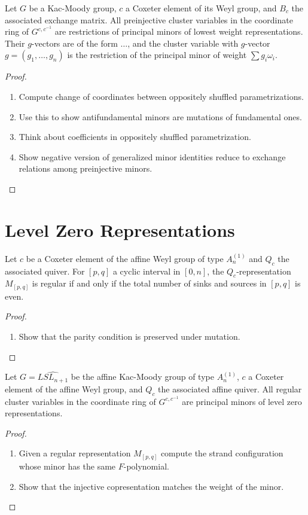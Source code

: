 \documentclass[11pt]{amsart}
\begin{document}
\begin{proposition}
Let $G$ be a Kac-Moody group, $c$ a Coxeter element of its Weyl group, and $B_c$ the associated exchange matrix.  All preinjective cluster variables in the coordinate ring of $G^{c,c^{-1}}$ are restrictions of principal minors of lowest weight representations.  Their $g$-vectors are of the form $\dotsc$, and the cluster variable with $g$-vector $g = (g_1,\dotsc,g_n)$ is the restriction of the principal minor of weight $\sum g_i \omega_i$.
\end{proposition}
\begin{proof}
\begin{enumerate}
\item Compute change of coordinates between oppositely shuffled parametrizations.
\item Use this to show antifundamental minors are mutations of fundamental ones.
\item Think about coefficients in oppositely shuffled parametrization.
\item Show negative version of generalized minor identities reduce to exchange relations among preinjective minors.
\end{enumerate}
\end{proof}

\section{Level Zero Representations}

\begin{lemma}
Let $c$ be a Coxeter element of the affine Weyl group of type $A_n^{(1)}$ and $Q_c$ the associated quiver.  For $[p,q]$ a cyclic interval in $[0,n]$, the $Q_c$-representation $M_{[p,q]}$ is regular if and only if the total number of sinks and sources in $[p,q]$ is even.
\end{lemma}
\begin{proof}
\begin{enumerate}
\item Show that the parity condition is preserved under mutation.
\end{enumerate}
\end{proof}

\begin{proposition}
Let $G = \widehat{LSL_{n+1}}$ be the affine Kac-Moody group of type $A_n^{(1)}$, $c$ a Coxeter element of the affine Weyl group, and $Q_c$ the associated affine quiver.  All regular cluster variables in the coordinate ring of $G^{c,c^{-1}}$ are principal minors of level zero representations.  
\end{proposition}
\begin{proof}
\begin{enumerate}
\item Given a regular representation $M_{[p,q]}$ compute the strand configuration whose minor has the same $F$-polynomial.
\item Show that the injective copresentation matches the weight of the minor.
\end{enumerate}
\end{proof}
\end{document}
